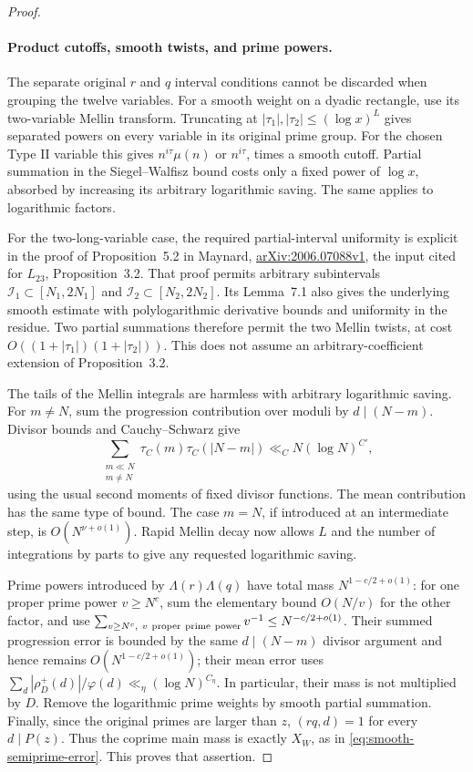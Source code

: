 \documentclass[11pt]{article}
\begin{document}
\begin{proof}
\paragraph{Product cutoffs, smooth twists, and prime powers.}
The separate original $r$ and $q$ interval conditions cannot be
discarded when grouping the twelve variables.
For a smooth weight on a dyadic rectangle, use its two-variable
Mellin transform. Truncating at
$|\tau_1|,|\tau_2|\le(\log x)^L$ gives separated powers on every
variable in its original prime group.
For the chosen Type II variable this gives $n^{i\tau}\mu(n)$
or $n^{i\tau}$, times a smooth cutoff.
Partial summation in the Siegel--Walfisz bound costs only a
fixed power of $\log x$, absorbed by increasing its arbitrary
logarithmic saving. The same applies to logarithmic factors.

For the two-long-variable case, the required partial-interval
uniformity is explicit in the proof of Proposition~5.2 in
Maynard,
\href{https://arxiv.org/pdf/2006.07088v1}
{arXiv:2006.07088v1}, the input cited for $L_{23}$,
Proposition~3.2. That proof permits arbitrary subintervals
$\mathcal I_1\subset[N_1,2N_1]$ and
$\mathcal I_2\subset[N_2,2N_2]$.
Its Lemma~7.1 also gives the underlying smooth estimate with
polylogarithmic derivative bounds and uniformity in the residue.
Two partial summations therefore permit the two Mellin twists,
at cost $O((1+|\tau_1|)(1+|\tau_2|))$.
This does not assume an arbitrary-coefficient extension of
Proposition~3.2.

The tails of the Mellin integrals are harmless with arbitrary
logarithmic saving. For $m\ne N$, sum the progression contribution
over moduli by $d\mid(N-m)$. Divisor bounds and Cauchy--Schwarz
give
\[
 \sum_{\substack{m\ll N\\m\ne N}}
    \tau_C(m)\tau_C(|N-m|)\ll_C N(\log N)^{C'},
\]
using the usual second moments of fixed divisor functions.
The mean contribution has the same type of bound.
The case $m=N$, if introduced at an intermediate step, is
$O(N^{\nu+o(1)})$. Rapid Mellin decay now allows $L$ and
the number of integrations by parts to give any requested
logarithmic saving.

Prime powers introduced by $\Lambda(r)\Lambda(q)$ have total
mass $N^{1-c/2+o(1)}$: for one proper prime power $v\ge N^c$,
sum the elementary bound $O(N/v)$ for the other factor, and use
$\sum_{v\ge N^c,\ v\ {\rm proper\ prime\ power}}v^{-1}
 \le N^{-c/2+o(1)}$.
Their summed progression error is bounded by the same
$d\mid(N-m)$ divisor argument and hence remains
$O(N^{1-c/2+o(1)})$; their mean error uses
$\sum_d|\rho_D^+(d)|/\varphi(d)\ll_\eta(\log N)^{C_\eta}$.
In particular, their mass is not multiplied by $D$.
Remove the logarithmic prime weights by smooth partial summation.
Finally, since the original primes are larger than $z$,
$(rq,d)=1$ for every $d\mid P(z)$. Thus the coprime main mass
is exactly $X_W$, as in \eqref{eq:smooth-semiprime-error}.
This proves that assertion.


\end{proof}
\end{document}
